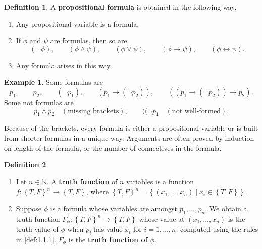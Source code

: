 \documentclass{article}
\newcommand{\N}{\mathbb{N}}
\newcommand{\rb}[1]{\left( #1 \right)}
\newcommand{\cb}[1]{\left\{ #1 \right\}}
\newcommand{\notb}[1]{\rb{\neg #1}}
\newcommand{\orb}[2]{\rb{#1 \lor #2}}
\newcommand{\andb}[2]{\rb{#1 \land #2}}
\newcommand{\impb}[2]{\rb{#1 \rightarrow #2}}
\newcommand{\iffb}[2]{\rb{#1 \leftrightarrow #2}}
\theoremstyle{definition}\newtheorem{definition}{Definition}[subsection]
\theoremstyle{definition}\newtheorem{remark}[definition]{Remark}
\theoremstyle{definition}\newtheorem*{example}{Example}
\theoremstyle{definition}\newtheorem*{note}{Note}
\begin{document}
\begin{definition}
\label{def:1.1.2}
A \textbf{propositional formula} is obtained in the following way.
\begin{enumerate}
\item Any propositional variable is a formula.
\item If $ \phi $ and $ \psi $ are formulas, then so are
$$ \notb{\phi}, \qquad \andb{\phi}{\psi}, \qquad \orb{\phi}{\psi}, \qquad \impb{\phi}{\psi}, \qquad \iffb{\phi}{\psi}. $$
\item Any formula arises in this way.
\end{enumerate}
\end{definition}

\begin{example}
Some formulas are
$$ p_1, \qquad p_2, \qquad \notb{p_1}, \qquad \impb{p_1}{\notb{p_2}}, \qquad \impb{\impb{p_1}{\notb{p_2}}}{p_2}. $$
Some not formulas are
$$ p_1 \land p_2 \quad \rb{\text{missing brackets}}, \qquad )( \neg p_1 \quad \rb{\text{not well-formed}}. $$
\end{example}

Because of the brackets, every formula is either a propositional variable or is built from shorter formulas in a unique way. Arguments are often proved by induction on length of the formula, or the number of connectives in the formula.

\begin{definition}
\hfill
\begin{enumerate}
\item Let $ n \in \N $. A \textbf{truth function} of $ n $ variables is a function $ f : \cb{T, F}^n \to \cb{T, F} $, where $ \cb{T, F}^n = \cb{\rb{x_1, \dots, x_n} \mid x_i \in \cb{T, F}} $.
\item Suppose $ \phi $ is a formula whose variables are amongst $ p_1, \dots, p_n $. We obtain a truth function $ F_\phi : \cb{T, F}^n \to \cb{T, F} $ whose value at $ \rb{x_1, \dots, x_n} $ is the truth value of $ \phi $ when $ p_i $ has value $ x_i $ for $ i = 1, \dots, n $, computed using the rules in \ref{def:1.1.1}. $ F_\phi $ is the \textbf{truth function of $ \phi$}.
\end{enumerate}
\end{definition}
\end{document}

